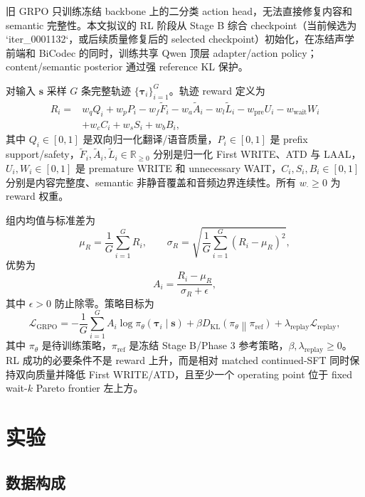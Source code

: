 \documentclass[11pt,a4paper]{article}
\newcommand{\vect}[1]{\bm{#1}}
\newcommand{\R}{\mathbb{R}}
\newcommand{\Loss}{\mathcal{L}}
\newcommand{\KL}{D_{\mathrm{KL}}}
\begin{document}
旧 GRPO 只训练冻结 backbone 上的二分类 action head，无法直接修复内容和 semantic 完整性。本文拟议的 RL 阶段从 Stage B 综合 checkpoint（当前候选为 `iter\_0001132`，或后续质量修复后的 selected checkpoint）初始化，在冻结声学前端和 BiCodec 的同时，训练共享 Qwen 顶层 adapter/action policy；content/semantic posterior 通过强 reference KL 保护。

对输入 $\vect{s}$ 采样 $G$ 条完整轨迹 $\{\vect{\tau}_i\}_{i=1}^{G}$。轨迹 reward 定义为
\begin{align}
 R_i={}&w_q Q_i+w_p P_i-w_f\widetilde{F}_i-w_a\widetilde{A}_i
 -w_l\widetilde{L}_i-w_{\mathrm{pre}}U_i-w_{\mathrm{wait}}W_i\nonumber\\
 &+w_c C_i+w_s S_i+w_b B_i,
 \label{eq:reward}
\end{align}
其中 $Q_i\in[0,1]$ 是双向归一化翻译/语音质量，$P_i\in[0,1]$ 是 prefix support/safety，$\widetilde{F}_i,\widetilde{A}_i,\widetilde{L}_i\in\R_{\ge0}$ 分别是归一化 First WRITE、ATD 与 LAAL，$U_i,W_i\in[0,1]$ 是 premature WRITE 和 unnecessary WAIT，$C_i,S_i,B_i\in[0,1]$ 分别是内容完整度、semantic 非静音覆盖和音频边界连续性。所有 $w_\cdot\ge0$ 为 reward 权重。

组内均值与标准差为
\begin{equation}
 \mu_R=\frac1G\sum_{i=1}^G R_i,
 \qquad
 \sigma_R=\sqrt{\frac1G\sum_{i=1}^G(R_i-\mu_R)^2},
 \label{eq:groupstats}
\end{equation}
优势为
\begin{equation}
 A_i=\frac{R_i-\mu_R}{\sigma_R+\epsilon},
 \label{eq:advantage}
\end{equation}
其中 $\epsilon>0$ 防止除零。策略目标为
\begin{equation}
 \Loss_{\mathrm{GRPO}}
 =-\frac1G\sum_{i=1}^{G}A_i\log\pi_\theta(\vect{\tau}_i\mid\vect{s})
 +\beta\KL\!\left(\pi_\theta\middle\|\pi_{\mathrm{ref}}\right)
 +\lambda_{\mathrm{replay}}\Loss_{\mathrm{replay}},
 \label{eq:grpo}
\end{equation}
其中 $\pi_\theta$ 是待训练策略，$\pi_{\mathrm{ref}}$ 是冻结 Stage B/Phase 3 参考策略，$\beta,\lambda_{\mathrm{replay}}\ge0$。RL 成功的必要条件不是 reward 上升，而是相对 matched continued-SFT 同时保持双向质量并降低 First WRITE/ATD，且至少一个 operating point 位于 fixed wait-$k$ Pareto frontier 左上方。

\section{实验}

\subsection{数据构成}
\end{document}
